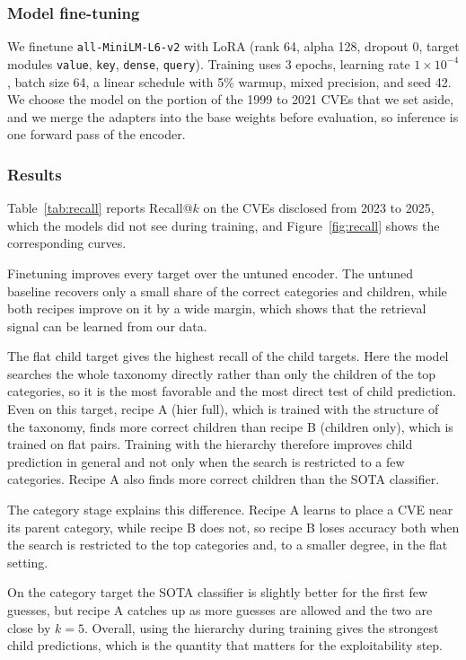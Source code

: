 \documentclass[conference,compsoc]{IEEEtran}
\begin{document}
\subsubsection{Model fine-tuning}

We finetune \texttt{all-MiniLM-L6-v2} with LoRA (rank 64, alpha 128, dropout 0, target modules \texttt{value}, \texttt{key}, \texttt{dense}, \texttt{query}). Training uses 3 epochs, learning rate $1\times10^{-4}$, batch size 64, a linear schedule with 5\% warmup, mixed precision, and seed 42. We choose the model on the portion of the 1999 to 2021 CVEs that we set aside, and we merge the adapters into the base weights before evaluation, so inference is one forward pass of the encoder.

\subsubsection{Results}

Table~\ref{tab:recall} reports Recall@$k$ on the CVEs disclosed from 2023 to 2025, which the models did not see during training, and Figure~\ref{fig:recall} shows the corresponding curves.

Finetuning improves every target over the untuned encoder. The untuned baseline recovers only a small share of the correct categories and children, while both recipes improve on it by a wide margin, which shows that the retrieval signal can be learned from our data.

The flat child target gives the highest recall of the child targets. Here the model searches the whole taxonomy directly rather than only the children of the top categories, so it is the most favorable and the most direct test of child prediction. Even on this target, recipe A (hier full), which is trained with the structure of the taxonomy, finds more correct children than recipe B (children only), which is trained on flat pairs. Training with the hierarchy therefore improves child prediction in general and not only when the search is restricted to a few categories. Recipe A also finds more correct children than the SOTA classifier.

The category stage explains this difference. Recipe A learns to place a CVE near its parent category, while recipe B does not, so recipe B loses accuracy both when the search is restricted to the top categories and, to a smaller degree, in the flat setting.

On the category target the SOTA classifier is slightly better for the first few guesses, but recipe A catches up as more guesses are allowed and the two are close by $k=5$. Overall, using the hierarchy during training gives the strongest child predictions, which is the quantity that matters for the exploitability step.
\end{document}
